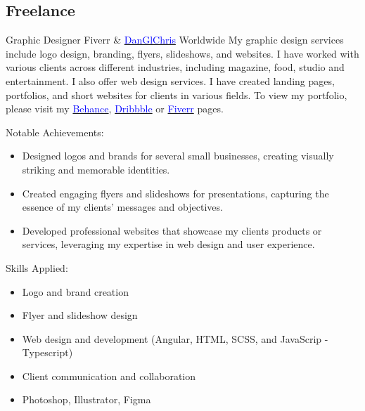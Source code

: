 \subsection{\textbf{Freelance}}

    {Graphic Designer}
    {Fiverr \& \href{https://danglchris.netlify.app/}{\textcolor{blue}{DanGlChris}}}
    {Worldwide}
    {
    \newline
    My graphic design services include logo design, branding, flyers, slideshows, and websites. I have worked with various clients across different industries, including magazine, food, studio and entertainment. 
    \newline
    I also offer web design services. I have created landing pages, portfolios, and short websites for clients in various fields.
    To view my portfolio, please visit my \href{https://www.behance.net/kankwandadaglox}{\textcolor{blue}{Behance}}, \href{https://dribbble.com/DanGlChris}{\textcolor{blue}{Dribbble}} or 
    \href{https://www.fiverr.com/danglchris/design-in-one-day-a-professional-creative-minimalist-logo-634d?utm_campaign=gigs_show&utm_medium=shared&utm_source=copy_link&utm_term=plvgj8}{\textcolor{blue}{Fiverr}} pages.
    } 
    {\newline
    Notable Achievements:
    \begin{itemize}
        \item Designed logos and brands for several small businesses, creating visually striking and memorable identities.
        \item Created engaging flyers and slideshows for presentations, capturing the essence of my clients' messages and objectives.
        \item Developed professional websites that showcase my clients products or services, leveraging my expertise in web design and user experience.
    \end{itemize}
    \vspace{1mm}
    Skills Applied:
    \begin{itemize}
        \item Logo and brand creation
        \item Flyer and slideshow design
        \item Web design and development (Angular, HTML, SCSS, and JavaScrip - Typescript)
        \item Client communication and collaboration
        \item Photoshop, Illustrator, Figma
    \end{itemize}
    }

